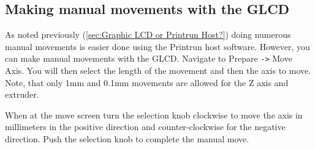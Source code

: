 \subsection{Making manual movements with the GLCD}
As noted previously (\ref{sec:Graphic LCD or Printrun Host?}) doing numerous manual movements is easier done using the Printrun host software. However, you can make manual movements with the GLCD. Navigate to Prepare \texttt{->} Move Axis. You will then select the length of the movement and then the axis to move. Note, that only 1mm and 0.1mm movements are allowed for the Z axis and extruder.

When at the move screen turn the selection knob clockwise to move the axis in millimeters in the positive direction and counter-clockwise for the negative direction. Push the selection knob to complete the manual move.


